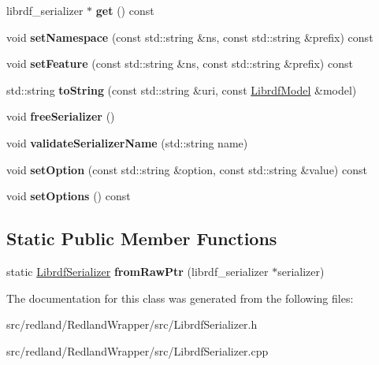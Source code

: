 \begin{DoxyCompactItemize}
librdf\+\_\+serializer $\ast$ {\bfseries get} () const
\item 
\mbox{\label{classredland_1_1LibrdfSerializer_ab621a575b7244c9d39e756b5e133766b}} 
void {\bfseries set\+Namespace} (const std\+::string \&ns, const std\+::string \&prefix) const
\item 
\mbox{\label{classredland_1_1LibrdfSerializer_abe500f5c5a1de1bdac86ab196a002b46}} 
void {\bfseries set\+Feature} (const std\+::string \&ns, const std\+::string \&prefix) const
\item 
\mbox{\label{classredland_1_1LibrdfSerializer_ac205990ca1dbf0ff1e56ea45e82ec8d2}} 
std\+::string {\bfseries to\+String} (const std\+::string \&uri, const \hyperlink{classredland_1_1LibrdfModel}{Librdf\+Model} \&model)
\item 
\mbox{\label{classredland_1_1LibrdfSerializer_aa185a5c5708bf4b08dfa5eb6a8b897b1}} 
void {\bfseries free\+Serializer} ()
\item 
\mbox{\label{classredland_1_1LibrdfSerializer_a4ea50f1f63c3cb7bb63da3fc55994fee}} 
void {\bfseries validate\+Serializer\+Name} (std\+::string name)
\item 
\mbox{\label{classredland_1_1LibrdfSerializer_a970fa3d23ba08a63533c758417de1808}} 
void {\bfseries set\+Option} (const std\+::string \&option, const std\+::string \&value) const
\item 
\mbox{\label{classredland_1_1LibrdfSerializer_ad2cb2ddcd225119a2a9a33001da22478}} 
void {\bfseries set\+Options} () const
\end{DoxyCompactItemize}
\subsection*{Static Public Member Functions}
\begin{DoxyCompactItemize}
\item 
\mbox{\label{classredland_1_1LibrdfSerializer_a58915bb2aa6b7c0eb438b5cc0148ef45}} 
static \hyperlink{classredland_1_1LibrdfSerializer}{Librdf\+Serializer} {\bfseries from\+Raw\+Ptr} (librdf\+\_\+serializer $\ast$serializer)
\end{DoxyCompactItemize}


The documentation for this class was generated from the following files\+:\begin{DoxyCompactItemize}
\item 
src/redland/\+Redland\+Wrapper/src/Librdf\+Serializer.\+h\item 
src/redland/\+Redland\+Wrapper/src/Librdf\+Serializer.\+cpp\end{DoxyCompactItemize}
